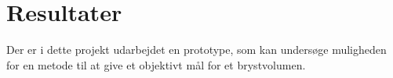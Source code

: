 \chapter{Resultater}

Der er i dette projekt udarbejdet en prototype, som kan undersøge muligheden for en metode til at give et objektivt mål for et brystvolumen. 

